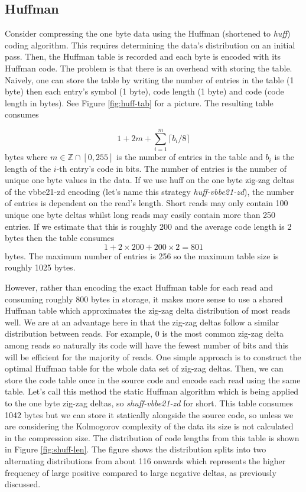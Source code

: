 \subsection{Huffman}

Consider compressing the one byte data using the Huffman
(shortened to \textit{huff}) coding algorithm. This requires determining the
data's distribution on an initial pass. Then, the Huffman table is
recorded and each byte is encoded with its Huffman code. The problem is that
there is an overhead with storing the table.  Naively, one can store the table
by writing the number of entries in the table (1 byte) then each entry's symbol
(1 byte), code length (1 byte) and code (code length in bytes). See Figure
\ref{fig:huff-tab} for a picture. The resulting
table consumes

\[ 1 + 2m + \sum_{i=1}^m\lceil b_i / 8 \rceil \]
bytes where $m\in\mathbb{Z}\cap[0,255]$ is the number of entries in the table
and $b_i$ is the length of the $i$-th entry's code in bits. The number of
entries is the number of unique one byte values in the data.
If we use huff on the one byte zig-zag deltas of the vbbe21-zd encoding (let's name this strategy
\textit{huff-vbbe21-zd}), the number of entries is
dependent on the read's length. Short reads may only contain 100 unique one byte
deltas whilst long reads may easily contain more than 250 entries. If we
estimate that this is roughly 200 and the average code length is 2 bytes then
the table consumes
\[ 1 + 2\times 200 + 200\times 2 = 801 \]
bytes. The maximum number of entries is 256 so the maximum table size is roughly
1025 bytes.

However, rather than encoding the exact Huffman table for each read and consuming
roughly 800 bytes in storage, it makes more
sense to use a shared Huffman table which approximates the zig-zag delta
distribution of most reads well. We are at an advantage here in that the zig-zag
deltas follow a similar distribution between reads.
For example, 0 is the most common zig-zag delta among reads so naturally its code will
have the fewest number of bits and this will be efficient for the majority of
reads. One simple approach is to construct the optimal Huffman table for the
whole data set of zig-zag deltas. Then, we can store the code table once in the
source code and encode each read using the same table. Let's call this method
the static Huffman algorithm which is being applied to the one byte zig-zag
deltas, so \textit{shuff-vbbe21-zd} for short. This table consumes
1042 bytes but we can store it statically alongside the source code, so unless
we are considering the Kolmogorov complexity of the data its size is not
calculated in the compression size. The distribution of code lengths from this
table is shown in Figure \ref{fig:shuff-len}. The figure shows the distribution
splits into two alternating distributions from about 116 onwards which
represents the higher frequency of large positive compared to large negative
deltas, as previously discussed.

